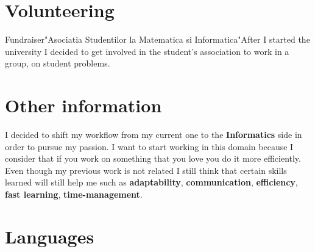 \documentclass[letterpaper]{twentysecondcv} %
\begin{document}
\begin{twentyshort}
\end{twentyshort}
\section{Volunteering}

\begin{twentyshort}
	 {\large Fundraiser}{"Asociatia Studentilor la Matematica si Informatica"}{After I started the university I decided to get involved in the student's association to work in a group, on student problems.}
\end{twentyshort}
\section{Other information}

{I decided to shift my workflow from my current one to the \textbf{Informatics} side in order to pursue my passion. I want to start working in this domain because I consider that if you work on something that you love you do it more efficiently. Even though my previous work is not related I still think that certain skills learned will still help me such as \textbf{adaptability}, \textbf{communication}, \textbf{efficiency}, \textbf{fast learning}, \textbf{time-management}.}

\section{Languages}

\begin{twentyshort}
\end{twentyshort}
\end{document}
